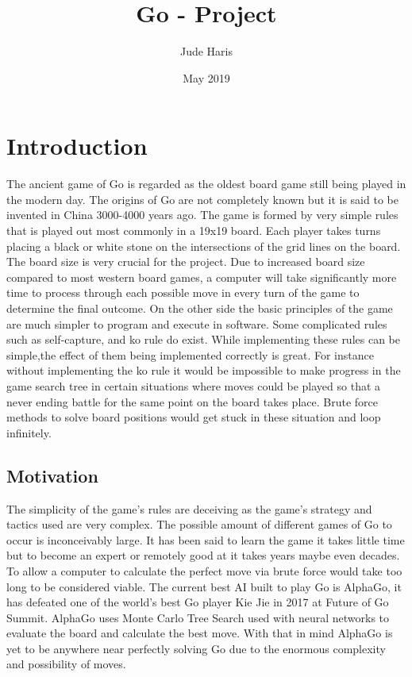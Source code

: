 \documentclass{l4proj}
\title{Go - Project}
\author{Jude Haris }
\date{May 2019}
\begin{document}
\maketitle

\chapter{Introduction}


The ancient game of Go is regarded as the oldest board game still being played in the modern day. The origins of Go are not completely known but it is said to be invented in China 3000-4000 years ago. The game is formed by very simple rules that is played out most commonly in a 19x19 board. Each player takes turns placing a black or white stone on the intersections of the grid lines on the board. The board size is very crucial for the project. Due to increased board size compared to most western board games, a computer will take significantly more time to process through each possible move in every turn of the game to determine the final outcome. On the other side the basic principles of the game are much simpler to program and execute in software. Some complicated rules such as self-capture, and ko rule do exist. While implementing these rules can be simple,the effect of them being implemented correctly is great. For instance without implementing the ko rule it would be impossible to make progress in the game search tree in certain situations where moves could be played so that a never ending battle for the same point on the board takes place. Brute force methods to solve board positions would get stuck in these situation and loop infinitely.


\section{Motivation}
The simplicity of the game's rules are deceiving as the game's strategy and tactics used are very complex. The possible amount of different games of Go to occur is inconceivably large. It has been said to learn the game it takes little time but to become an expert or remotely good at it takes years maybe even decades. To allow a computer to calculate the perfect move via brute force would take too long to be considered viable. The current best AI built to play Go is AlphaGo, it has defeated one of the world's best Go player Kie Jie in 2017 at Future of Go Summit. AlphaGo uses Monte Carlo Tree Search used with neural networks to evaluate the board and calculate the best move. With that in mind AlphaGo is yet to be anywhere near perfectly solving Go due to the enormous complexity and possibility of moves.
\end{document}
